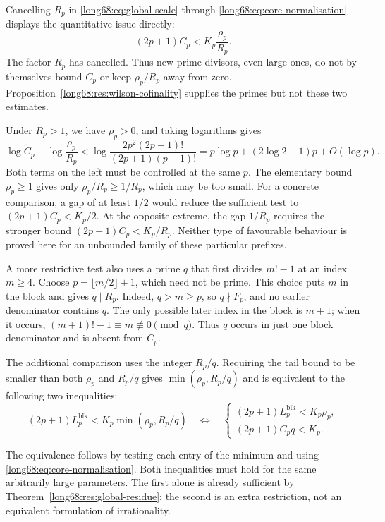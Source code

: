 \documentclass[11pt]{article}
\newcommand{\Lc}{L}
\begin{document}
Cancelling $R_p$ in \eqref{long68:eq:global-scale} through
\eqref{long68:eq:core-normalisation} displays the quantitative issue directly:
\begin{equation}\label{long68:eq:core-gap-scale}
 (2p+1)C_p<K_p\frac{\rho_p}{R_p}.
\end{equation}
The factor $R_p$ has cancelled. Thus new prime divisors, even large ones,
do not by themselves bound $C_p$ or keep $\rho_p/R_p$ away from zero.
Proposition~\ref{long68:res:wilson-cofinality} supplies the primes but not
these two estimates.

Under $R_p>1$, we have $\rho_p>0$, and taking logarithms gives
\[
 \log\widetilde C_p-\log\frac{\rho_p}{R_p}
 <\log\frac{2p^2(2p-1)!}{(2p+1)(p-1)!}
 =p\log p+(2\log2-1)p+O(\log p).
\]
Both terms on the left must be controlled at the same $p$. The elementary
bound $\rho_p\ge1$ gives only $\rho_p/R_p\ge1/R_p$, which may be too small.
For a concrete comparison, a gap of at least $1/2$ would reduce the sufficient
test to $(2p+1)C_p<K_p/2$. At the opposite extreme, the gap $1/R_p$ requires
the stronger bound $(2p+1)C_p<K_p/R_p$. Neither type of favourable behaviour
is proved here for an unbounded family of these particular prefixes.

\label{long68:res:lead-moving-factor-split}
\label{long68:res:moving-factor-scale-split}
A more restrictive test also uses a prime $q$ that first divides $m!-1$
at an index $m\ge4$. Choose $p=\lfloor m/2\rfloor+1$, which need not be
prime. This choice puts $m$ in the block and gives $q\mid R_p$. Indeed,
$q>m\ge p$, so $q\nmid F_p$, and no earlier denominator contains $q$.
The only possible later index in the block is $m+1$; when it occurs,
$(m+1)!-1\equiv m\not\equiv0\pmod q$. Thus $q$ occurs in just one block
denominator and is absent from $C_p$.

The additional comparison uses the integer $R_p/q$. Requiring the tail
bound to be smaller than both $\rho_p$ and $R_p/q$ gives
$\min(\rho_p,R_p/q)$ and is equivalent to the following two inequalities:
\begin{equation}\label{long68:eq:factor-split}
 (2p+1)\Lc^{\mathrm{blk}}_p<K_p\min(\rho_p,R_p/q)
 \quad\Longleftrightarrow\quad
 \begin{cases}
 (2p+1)\Lc^{\mathrm{blk}}_p<K_p\rho_p,\\
 (2p+1)C_pq<K_p .
 \end{cases}
\end{equation}


The equivalence follows by testing each entry of the minimum and using
\eqref{long68:eq:core-normalisation}. Both inequalities must hold for the
same arbitrarily large parameters. The first alone is already sufficient
by Theorem~\ref{long68:res:global-residue}; the second is an extra restriction,
not an equivalent formulation of irrationality.
\end{document}
